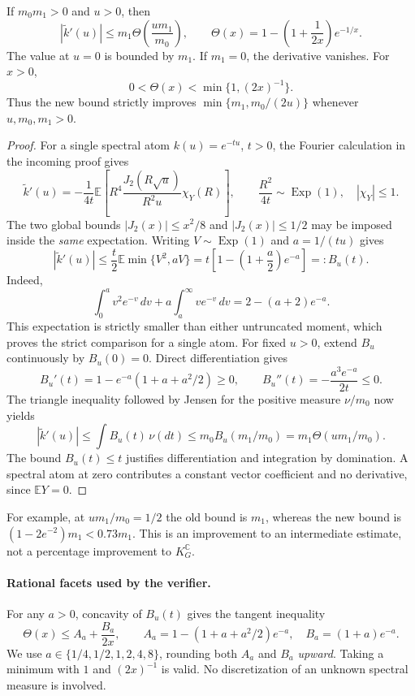 \begin{theorem}
\label{thm:kcompact-radial}
If $m_0m_1>0$ and $u>0$, then
\[
 \boxed{
 |\widetilde k'(u)|
 \le m_1\Theta\!\left(\frac{um_1}{m_0}\right),\qquad
 \Theta(x)=1-\left(1+\frac1{2x}\right)e^{-1/x}.}
\]
The value at $u=0$ is bounded by $m_1$. If $m_1=0$, the derivative
vanishes. For $x>0$,
\[
 0<\Theta(x)<\min\{1,(2x)^{-1}\}.
\]
Thus the new bound strictly improves
$\min\{m_1,m_0/(2u)\}$ whenever $u,m_0,m_1>0$.
\end{theorem}

\begin{proof}
For a single spectral atom $k(u)=e^{-tu}$, $t>0$, the Fourier calculation
in the incoming proof gives
\[
 \widetilde k'(u)
 =-\frac1{4t}\mathbb E\!\left[
 R^4\frac{J_2(R\sqrt u)}{R^2u}\chi_Y(R)\right],
 \qquad \frac{R^2}{4t}\sim\operatorname{Exp}(1),\quad |\chi_Y|\le1.
\]
The two global bounds $|J_2(x)|\le x^2/8$ and $|J_2(x)|\le1/2$
may be imposed inside the \emph{same} expectation. Writing $V\sim
\operatorname{Exp}(1)$ and $a=1/(tu)$ gives
\[
 |\widetilde k'(u)|
 \le \frac t2\mathbb E\min\{V^2,aV\}
 =t\left[1-\left(1+\frac a2\right)e^{-a}\right]=:B_u(t).
\]
Indeed,
\[
 \int_0^a v^2e^{-v}\,dv+a\int_a^\infty ve^{-v}\,dv
 =2-(a+2)e^{-a}.
\]
This expectation is strictly smaller than either untruncated moment,
which proves the strict comparison for a single atom.
For fixed $u>0$, extend $B_u$ continuously by $B_u(0)=0$. Direct
differentiation gives
\[
 B_u'(t)=1-e^{-a}(1+a+a^2/2)\ge0,\qquad
 B_u''(t)=-\frac{a^3e^{-a}}{2t}\le0.
\]
The triangle inequality followed by Jensen for the positive measure
$\nu/m_0$ now yields
\[
 |\widetilde k'(u)|\le\int B_u(t)\,\nu(dt)
 \le m_0B_u(m_1/m_0)=m_1\Theta(um_1/m_0).
\]
The bound $B_u(t)\le t$ justifies differentiation and integration
by domination. A spectral atom at zero contributes a constant vector
coefficient and no derivative, since $\mathbb E Y=0$.
\end{proof}

For example, at $um_1/m_0=1/2$ the old bound is $m_1$, whereas the
new bound is $(1-2e^{-2})m_1<0.73m_1$. This is an improvement to an
intermediate estimate, not a percentage improvement to $K_G^{\mathbb C}$.

\paragraph{Rational facets used by the verifier.}
For any $a>0$, concavity of $B_u(t)$ gives the tangent inequality
\[
 \Theta(x)\le A_a+\frac{B_a}{2x},\qquad
 A_a=1-(1+a+a^2/2)e^{-a},\quad B_a=(1+a)e^{-a}.
\]
We use $a\in\{1/4,1/2,1,2,4,8\}$, rounding both $A_a$ and $B_a$
\emph{upward}. Taking a minimum with $1$ and $(2x)^{-1}$ is valid.
No discretization of an unknown spectral measure is involved.

